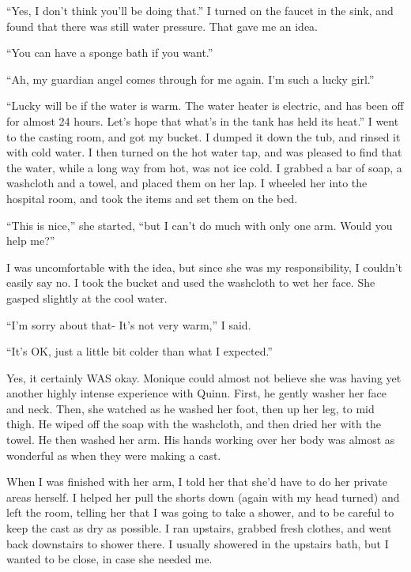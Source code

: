 ``Yes, I don't think you'll be doing that.'' I turned on the faucet in the sink, and found
that there was still water pressure. That gave me an idea.

``You can have a sponge bath if you want.''

``Ah, my guardian angel comes through for me again. I'm such a lucky girl.''

``Lucky will be if the water is warm. The water heater is electric, and has been off for
almost 24 hours. Let's hope that what's in the tank has held its heat.'' I went to the casting
room, and got my bucket. I dumped it down the tub, and rinsed it with cold water. I then turned
on the hot water tap, and was pleased to find that the water, while a long way from hot, was not
ice cold. I grabbed a bar of soap, a washcloth and a towel, and placed them on her lap. I
wheeled her into the hospital room, and took the items and set them on the bed.

``This is nice,'' she started, ``but I can't do much with only one arm. Would you help
me?''

I was uncomfortable with the idea, but since she was my responsibility, I couldn't easily
say no. I took the bucket and used the washcloth to wet her face. She gasped slightly at the
cool water.

``I'm sorry about that- It's not very warm,'' I said.

``It's OK, just a little bit colder than what I expected.''

\begin{thought}
Yes, it certainly WAS okay. Monique could almost not believe she was having yet another
highly intense experience with Quinn. First, he gently washer her face and neck. Then, she
watched as he washed her foot, then up her leg, to mid thigh. He wiped off the soap with the
washcloth, and then dried her with the towel. He then washed her arm. His hands working over her
body was almost as wonderful as when they were making a cast.
\end{thought}

When I was finished with her arm, I told her that she'd have to do her private areas
herself. I helped her pull the shorts down (again with my head turned) and left the room,
telling her that I was going to take a shower, and to be careful to keep the cast as dry as
possible. I ran upstairs, grabbed fresh clothes, and went back downstairs to shower there. I
usually showered in the upstairs bath, but I wanted to be close, in case she needed me.

